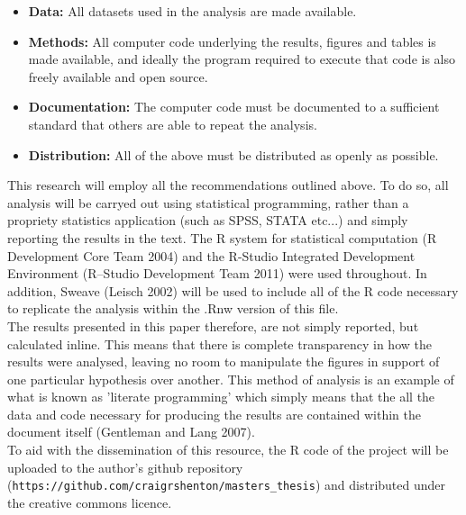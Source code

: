 \begin{spacing}{1.5}
\begin{itemize}
  \item \textbf{Data:} All datasets used in the analysis are made available.
  \item \textbf{Methods:} All computer code underlying the results, figures and tables is made available, and ideally the program required to execute that code is also freely available and open source.
  \item \textbf{Documentation:} The computer code must be documented to a sufficient standard that others are able to repeat the analysis.
  \item \textbf{Distribution:} All of the above must be distributed as openly as possible.
\end{itemize}

\noindent This research will employ all the recommendations outlined above. To do so, all analysis will be carryed out using statistical programming, rather than a propriety statistics application (such as SPSS, STATA etc...) and simply reporting the results in the text. The R system for statistical computation (R Development Core Team 2004) and the R-Studio Integrated Development Environment (R--Studio Development Team 2011) were used throughout. In addition, Sweave (Leisch 2002) will be used to include all of the R code necessary to replicate the analysis within the .Rnw version of this file. \\ 

\noindent The results presented in this paper therefore, are not simply reported, but calculated inline. This means that there is complete transparency in how the results were analysed, leaving no room to manipulate the figures in support of one particular hypothesis over another. This method of analysis is an example of what is known as 'literate programming' which simply means that the all the data and code necessary for producing the results are contained within the document itself (Gentleman and Lang 2007).\\

\noindent To aid with the dissemination of this resource, the R code of the project will be uploaded to the author's github repository (\texttt{https://github.com/craigrshento\linebreak n/masters\_thesis}) and distributed under the creative commons licence.
\end{spacing}
\clearpage
